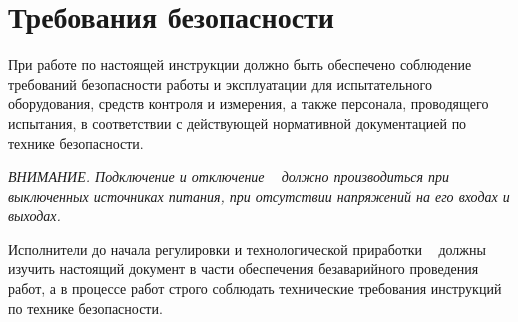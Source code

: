 
  \section{Требования безопасности}
  \point При работе по настоящей инструкции должно быть обеспечено соблюдение требований безопасности работы и эксплуатации для 
  испытательного оборудования, средств контроля и измерения, а также персонала, проводящего испытания, в соответствии с действующей нормативной документацией по технике безопасности.
  
  \emph{ВНИМАНИЕ. Подключение и отключение \DocProductShortTitle~ должно производиться при выключенных источниках питания, при отсутствии напряжений на его входах и выходах.}
  
  \point Исполнители до начала регулировки и технологической приработки \DocProductShortTitle~ должны изучить настоящий документ в части обеспечения безаварийного проведения работ, 
  а в процессе работ строго соблюдать технические требования инструкций по технике безопасности.
  
